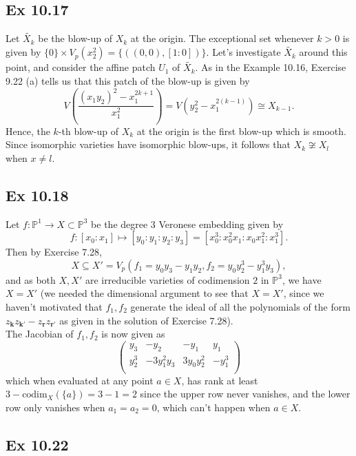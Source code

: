 \documentclass{article}
\theoremstyle{definition}
\renewcommand{\P}{\mathbb{P}}
\newcommand{\PP}[1]{\P^{#1}}
\newcommand{\codim}{\text{codim}}
\begin{document}
\subsection*{Ex 10.17}

Let $\widetilde{X_k}$ be the blow-up of $X_k$ at the origin. The exceptional
set whenever $k > 0$ is given by $\{0\} \times V_p(x_2^2) = \{((0, 0), [1 :
0])\}$. Let's investigate $\widetilde{X_k}$ around this point, and 
consider the affine patch $U_1$ of $\widetilde{X_k}$. As in the Example 10.16,
Exercise 9.22 (a) tells us that this patch of the blow-up is given by
\[
	V\left(\frac{(x_1y_2)^2 - x_1^{2k + 1}}{x_1^{2}}\right)
	=
	V(y_2^{2} - x_1^{2(k - 1)})
	\cong
	X_{k - 1}.
\]
Hence, the $k$-th blow-up of $X_k$ at the origin is the first blow-up which is
smooth. Since isomorphic varieties have isomorphic blow-ups, it follows that
$X_k \not \cong X_l$ when $x \not = l$.

\subsection*{Ex 10.18}
Let $f : \PP{1} \to X \subset \PP{3}$ be the degree $3$ Veronese embedding
given by 
\[
	f 
	: 
	[x_0 : x_1] 
	\mapsto 
	[y_0 : y_1 : y_2 : y_3]
	=
	[x_0^{3} : x_0^{2}x_1 : x_0x_1^{2} : x_1^{3}].
\]
Then by Exercise 7.28, 
\[
	X \subseteq X' = V_p(f_1 = y_0y_3 - y_1y_2, f_2 = y_0 y_2^{3} - y_1^{3} y_3),
\] 
and as both $X, X'$ are irreducible varieties of codimension $2$ in $\PP{3}$,
we have $X = X'$ (we needed the dimensional argument to see that $X = X'$,
since we haven't motivated that $f_1,f_2$ generate the ideal of all the
polynomials of the form $z_{\bm{k}}z_{\bm{k}'} - z_{\bm{r}}z_{\bm{r}'}$ as
given in the solution of Exercise 7.28). \\

The Jacobian of $f_1, f_2$ is now given as 
\[
\begin{pmatrix}
	y_3 & -y_2 & -y_1 & y_1 \\	
	y_2^{3} & -3y_1^{2} y_3 & 3y_0y_2^{2} & -y_1^3 \\	
\end{pmatrix}
\] 
which when evaluated at any point $a \in X$, has rank at least $3 -
\codim_X(\{a\}) = 3 - 1 = 2$ since the upper row never vanishes, and the lower
row only vanishes when $a_1 = a_2 = 0$, which can't happen when $a \in X$.

\subsection*{Ex 10.22}
\end{document}

